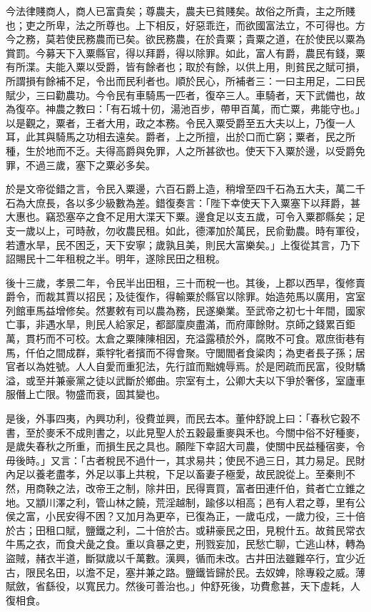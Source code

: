 \begin{pinyinscope}
今法律賤商人，商人已富貴矣；尊農夫，農夫已貧賤矣。故俗之所貴，主之所賤也；吏之所卑，法之所尊也。上下相反，好惡乖迕，而欲國富法立，不可得也。方今之務，莫若使民務農而已矣。欲民務農，在於貴粟；貴粟之道，在於使民以粟為賞罰。今募天下入粟縣官，得以拜爵，得以除罪。如此，富人有爵，農民有錢，粟有所渫。夫能入粟以受爵，皆有餘者也；取於有餘，以供上用，則貧民之賦可損，所謂損有餘補不足，令出而民利者也。順於民心，所補者三：一曰主用足，二曰民賦少，三曰勸農功。今令民有車騎馬一匹者，復卒三人。車騎者，天下武備也，故為復卒。神農之教曰：「有石城十仞，湯池百步，帶甲百萬，而亡粟，弗能守也。」以是觀之，粟者，王者大用，政之本務。令民入粟受爵至五大夫以上，乃復一人耳，此其與騎馬之功相去遠矣。爵者，上之所擅，出於口而亡窮；粟者，民之所種，生於地而不乏。夫得高爵與免罪，人之所甚欲也。使天下入粟於邊，以受爵免罪，不過三歲，塞下之粟必多矣。

於是文帝從錯之言，令民入粟邊，六百石爵上造，稍增至四千石為五大夫，萬二千石為大庶長，各以多少級數為差。錯復奏言：「陛下幸使天下入粟塞下以拜爵，甚大惠也。竊恐塞卒之食不足用大渫天下粟。邊食足以支五歲，可令入粟郡縣矣；足支一歲以上，可時赦，勿收農民租。如此，德澤加於萬民，民俞勤農。時有軍役，若遭水旱，民不困乏，天下安寧；歲孰且美，則民大富樂矣。」上復從其言，乃下詔賜民十二年租稅之半。明年，遂除民田之租稅。

後十三歲，孝景二年，令民半出田租，三十而稅一也。其後，上郡以西旱，復修賣爵令，而裁其賈以招民；及徒復作，得輸粟於縣官以除罪。始造苑馬以廣用，宮室列館車馬益增修矣。然婁敕有司以農為務，民遂樂業。至武帝之初七十年間，國家亡事，非遇水旱，則民人給家足，都鄙廩庾盡滿，而府庫餘財。京師之錢累百鉅萬，貫朽而不可校。太倉之粟陳陳相因，充溢露積於外，腐敗不可食。眾庶街巷有馬，仟伯之間成群，乘牸牝者擯而不得會聚。守閭閻者食粱肉；為吏者長子孫；居官者以為姓號。人人自愛而重犯法，先行誼而黜媿辱焉。於是罔疏而民富，役財驕溢，或至并兼豪黨之徒以武斷於鄉曲。宗室有土，公卿大夫以下爭於奢侈，室廬車服僭上亡限。物盛而衰，固其變也。

是後，外事四夷，內興功利，役費並興，而民去本。董仲舒說上曰：「春秋它穀不書，至於麥禾不成則書之，以此見聖人於五穀最重麥與禾也。今關中俗不好種麥，是歲失春秋之所重，而損生民之具也。願陛下幸詔大司農，使關中民益種宿麥，令毋後時。」又言：「古者稅民不過什一，其求易共；使民不過三日，其力易足。民財內足以養老盡孝，外足以事上共稅，下足以畜妻子極愛，故民說從上。至秦則不然，用商鞅之法，改帝王之制，除井田，民得賣買，富者田連仟伯，貧者亡立錐之地。又顓川澤之利，管山林之饒，荒淫越制，踰侈以相高；邑有人君之尊，里有公侯之富，小民安得不困？又加月為更卒，已復為正，一歲屯戍，一歲力役，三十倍於古；田租口賦，鹽鐵之利，二十倍於古。或耕豪民之田，見稅什五。故貧民常衣牛馬之衣，而食犬彘之食。重以貪暴之吏，刑戮妄加，民愁亡聊，亡逃山林，轉為盜賊，赭衣半道，斷獄歲以千萬數。漢興，循而未改。古井田法雖難卒行，宜少近古，限民名田，以澹不足，塞并兼之路。鹽鐵皆歸於民。去奴婢，除專殺之威。薄賦斂，省繇役，以寬民力。然後可善治也。」仲舒死後，功費愈甚，天下虛耗，人復相食。


\end{pinyinscope}
